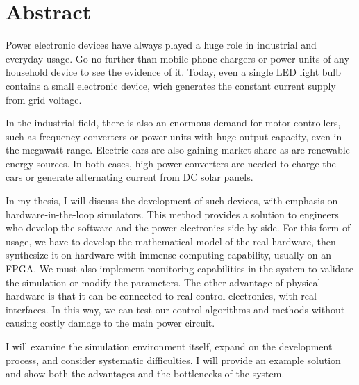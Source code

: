 \chapter*{Abstract}

Power electronic devices have always played a huge role in industrial and everyday usage. Go no further than mobile phone chargers or power units of any household device to see the evidence of it. Today, even a single LED light bulb contains a small electronic device, wich generates the constant current supply from grid voltage.
 
In the industrial field, there is also an enormous demand for motor controllers, such as frequency converters or power units with huge output capacity, even in the megawatt range. Electric cars are also gaining market share as are renewable energy sources. In both cases, high-power converters are needed to charge the cars or generate alternating current from DC solar panels.
 
In my thesis, I will discuss the development of such devices, with emphasis on hardware-in-the-loop simulators. This method provides a solution to engineers who develop the software and the power electronics side by side. For this form of usage, we have to develop the mathematical model of the real hardware, then synthesize it on hardware with immense computing capability, usually on an FPGA. We must also implement monitoring capabilities in the system to validate the simulation or modify the parameters. The other advantage of physical hardware is that it can be connected to real control electronics, with real interfaces. In this way, we can test our control algorithms and methods without causing costly damage to the main power circuit. 
 
I will examine the simulation environment itself, expand on the development process, and consider systematic difficulties. I will provide an example solution and show both the advantages and the bottlenecks of the system.


\vfill
\selectthesislanguage

\setcounter{romanPage}{\value{page}}
